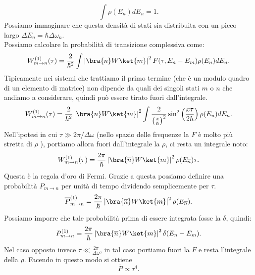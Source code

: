 \[
    \int\rho(E_n) dE_n = 1
.\] 
Possiamo immaginare che questa densità di stati sia distribuita con un picco largo $\Delta E_n = \hbar \Delta\omega_n $. \\
Possiamo calcolare la probabilità di transizione complessiva come:
\[
    W^{(1)}_{m\to n}(\tau) =
    \frac{2}{\hbar ^2}\int\left|\bra{n}W \ket{m}\right|^2 F(\tau, E_n-E_m)\rho(E_n) dE_n 
.\] 
Tipicamente nei sistemi che trattiamo il primo termine (che è un modulo quadro di un elemento di matrice) non dipende da quali dei singoli stati $m$ o $n$  che andiamo a considerare, quindi può essere tirato fuori dall'integrale.
\[
    W^{(1)}_{m\to n}(\tau) =
    \frac{2}{\hbar ^2}\left|\bra{n}W \ket{m}\right|^2\int\frac{2}{\left(\frac{x}{\hbar }\right)^2}\sin^2\left(\frac{x\tau}{2\hbar }\right) \rho(E_n) dE_n
.\] 
Nell'ipotesi in cui $\tau\gg 2\pi /\Delta\omega$ (nello spazio delle frequenze la $F$ è molto più stretta di $\rho$  ), portiamo allora fuori dall'integrale la $\rho$, ci resta un integrale noto:
\[
    W^{(1)}_{m\to n}(\tau) =
    \frac{2\pi}{\hbar}\left|\bra{\overline{n}}W \ket{m}\right|^2\rho(E_{\overline{n}})\tau 
.\] 
Questa è la regola d'oro di Fermi. Grazie a questa possiamo definire una probabilità $P_{m\to n}$ per unità di tempo dividendo semplicemente per $\tau$.
\[
    \overline{P}_{m\to n}^{(1) } =
    \frac{2\pi}{\hbar}\left|\bra{\overline{n}}W \ket{m}\right|^2\rho(E_{\overline{n}})
.\] 
Possiamo imporre che tale probabilità prima di essere integrata fosse la $\delta$, quindi:
\[
    P_{m\to n}^{(1) } =
    \frac{2\pi}{\hbar}\left|\bra{\overline{n}}W \ket{m}\right|^2\delta (E_n-E_m) 
.\] 
Nel caso opposto invece $\tau\ll\frac{2\pi }{\Delta\omega}$, in tal caso portiamo fuori la $F$ e resta l'integrale della $\rho$. Facendo in questo modo si ottiene 
\[
\overline{P} \propto \tau^4
.\] 
